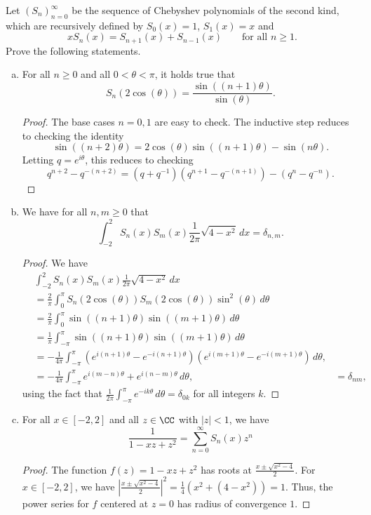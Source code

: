 \documentclass{article}
\begin{document}
   Let $(S_n)_{n=0}^\infty$ be the sequence of Chebyshev polynomials of the second kind, which are recursively defined by $S_0(x) = 1$, $S_1(x) = x$ and
  $$x S_n(x) = S_{n+1}(x) + S_{n-1}(x) \qquad \text{for all } n \ge 1.$$
  Prove the following statements.
  \begin{enumerate}[(a)]
  \item  For all $n \ge 0$ and all $0 < \theta < \pi$, it holds true that
    $$S_n( 2 \cos(\theta)) = \frac{\sin((n+1) \theta)}{\sin(\theta)}.$$
    \begin{proof}
      The base cases $n = 0,1$ are easy to check.  The inductive step reduces to
      checking the identity
      $$\sin((n+2) \theta) = 2 \cos(\theta) \sin((n+1) \theta) - \sin(n \theta).$$
      Letting $q = e^{i \theta}$, this reduces to checking
      $$ q^{n+2} - q^{-(n+2)} = (q + q^{-1}) (q^{n+1} - q^{-(n+1)}) - (q^{n} - q^{-n}).$$
    \end{proof}

  \item We have for all $n, m \ge 0$ that
    $$ \int_{-2}^2 S_n(x) S_m(x) \frac{1}{2\pi}  \sqrt{4 - x^2} \, dx = \delta_{n,m}. $$
    \begin{proof}
      We have
      \begin{align*}
        & \int_{-2}^2 S_n(x) S_m(x) \frac{1}{2\pi}  \sqrt{4 - x^2} \, dx \\
        & = \frac{2}{\pi}\int_{0}^\pi S_n(2 \cos(\theta)) S_m(2 \cos(\theta)) \sin^2(\theta) \, d \theta   \\
        & = \frac{2}{\pi} \int_{0}^\pi {\sin((n+1)\theta) \sin((m+1)\theta)} \, d \theta \\
        & = \frac{1}{\pi} \int_{-\pi}^\pi {\sin((n+1)\theta) \sin((m+1)\theta)} \, d \theta \\
        & = -\frac{1}{4\pi} \int_{-\pi}^\pi  (e^{i(n+1) \theta} - e^{-i(n+1) \theta}) (e^{i(m+1) \theta} - e^{-i(m+1) \theta})\, d \theta, \\
        & = -\frac{1}{4\pi} \int_{-\pi}^\pi  e^{i(m-n)\theta} + e^{i(n-m) \theta}\, d \theta,
        & = \delta_{nm},
      \end{align*}
      using the fact that $\frac{1}{2\pi} \int_{-\pi}^\pi e^{-ik\theta} \, d\theta = \delta_{0k}$ for all integers $k$.      
    \end{proof}
  \item For all $x \in [-2, 2]$ and all $z \in \CC$ with $|z| < 1$, we have
    $$ \frac{1}{1 - xz + z^2}  = \sum_{n=0}^\infty S_n(x) z^n$$
    \begin{proof}
      The function $f(z) = 1 - xz + z^2$ has roots at
      $\frac{x \pm \sqrt{x^2 - 4}}{2}$.  For $x \in [-2,2]$, we have
      $\left| \frac{x \pm \sqrt{x^2 - 4}}{2} \right|^2 = \frac{1}{4} \left(x^2      + (4- x^2) \right) = 1$.  Thus,  the power series for $f$ centered at $z = 0$ has radius of convergence $1$.


\end{proof}
\end{enumerate}
\end{document}
